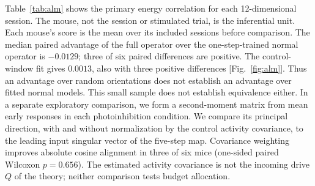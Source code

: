 \documentclass[aps,10pt,onecolumn,superscriptaddress,nofootinbib,
  longbibliography,amsmath,amssymb,floatfix]{revtex4-2}
\begin{document}
Table~\ref{tab:alm} shows the primary energy correlation for each
12-dimensional session. The mouse, not the session or stimulated
trial, is the inferential unit. Each mouse's score is the mean over
its included sessions before comparison. The median paired advantage
of the full operator over the one-step-trained normal operator is
\(-0.0129\); three of six paired differences are positive. The
control-window fit gives \(0.0013\), also with three positive
differences [Fig.~\ref{fig:alm}]. Thus an advantage over random
orientations does not establish an advantage over fitted normal
models. This small sample does not establish equivalence either.
In a separate exploratory comparison, we form a second-moment
matrix from mean early responses in each photoinhibition condition.
We compare its principal direction, with and without normalization
by the control activity covariance, to the leading input singular
vector of the five-step map. Covariance weighting improves
absolute cosine alignment in three of six mice (one-sided paired
Wilcoxon \(p=0.656\)). The estimated activity covariance is not the
incoming drive \(Q\) of the theory; neither comparison tests budget
allocation.
\end{document}
